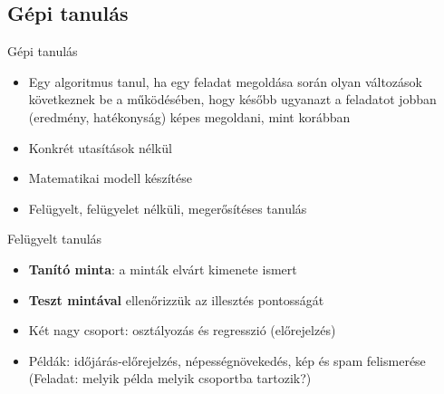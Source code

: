 \subsection{Gépi tanulás}
\begin{frame}{Gépi tanulás}
    \begin{itemize}
        \item Egy algoritmus tanul, ha egy feladat megoldása során olyan változások következnek be a működésében, hogy később ugyanazt a feladatot jobban (eredmény, hatékonyság) képes megoldani, mint korábban
        \item Konkrét utasítások nélkül
        \item Matematikai modell készítése
        \item Felügyelt, felügyelet nélküli, megerősítéses tanulás
    \end{itemize}
\end{frame}

\begin{frame}{Felügyelt tanulás}
    \begin{itemize}
        \item {\bf Tanító minta}: a minták elvárt kimenete ismert
        \item {\bf Teszt mintával} ellenőrizzük az illesztés pontosságát
        \item Két nagy csoport: osztályozás és regresszió (előrejelzés)
        \item Példák: időjárás-előrejelzés, népességnövekedés, kép és spam felismerése (Feladat: melyik példa melyik csoportba tartozik?)
    \end{itemize}
\end{frame}

